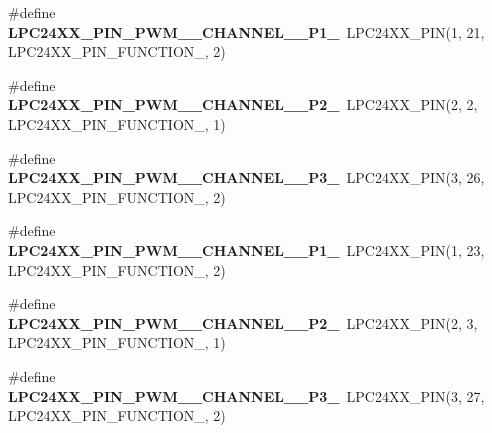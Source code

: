 \begin{DoxyCompactItemize}
\mbox{\label{group__lpc24xx__io_ga3a4b13e38c5b15656f0f3ecd24931f71}} 
\#define {\bfseries L\+P\+C24\+X\+X\+\_\+\+P\+I\+N\+\_\+\+P\+W\+M\+\_\+\_\+\+C\+H\+A\+N\+N\+E\+L\+\_\+\_\+\+P1\+\_}~L\+P\+C24\+X\+X\+\_\+\+P\+IN(1, 21, L\+P\+C24\+X\+X\+\_\+\+P\+I\+N\+\_\+\+F\+U\+N\+C\+T\+I\+O\+N\+\_, 2)
\item 
\mbox{\label{group__lpc24xx__io_gaea149c753bb90d6bdc8951e6630be4a4}} 
\#define {\bfseries L\+P\+C24\+X\+X\+\_\+\+P\+I\+N\+\_\+\+P\+W\+M\+\_\+\_\+\+C\+H\+A\+N\+N\+E\+L\+\_\+\_\+\+P2\+\_}~L\+P\+C24\+X\+X\+\_\+\+P\+IN(2, 2, L\+P\+C24\+X\+X\+\_\+\+P\+I\+N\+\_\+\+F\+U\+N\+C\+T\+I\+O\+N\+\_, 1)
\item 
\mbox{\label{group__lpc24xx__io_ga36bcd51ed83a382d78d56f1c2cdf02e0}} 
\#define {\bfseries L\+P\+C24\+X\+X\+\_\+\+P\+I\+N\+\_\+\+P\+W\+M\+\_\+\_\+\+C\+H\+A\+N\+N\+E\+L\+\_\+\_\+\+P3\+\_}~L\+P\+C24\+X\+X\+\_\+\+P\+IN(3, 26, L\+P\+C24\+X\+X\+\_\+\+P\+I\+N\+\_\+\+F\+U\+N\+C\+T\+I\+O\+N\+\_, 2)
\item 
\mbox{\label{group__lpc24xx__io_ga2d75d3a91f6b14ef36daf17ddf568cfe}} 
\#define {\bfseries L\+P\+C24\+X\+X\+\_\+\+P\+I\+N\+\_\+\+P\+W\+M\+\_\+\_\+\+C\+H\+A\+N\+N\+E\+L\+\_\+\_\+\+P1\+\_}~L\+P\+C24\+X\+X\+\_\+\+P\+IN(1, 23, L\+P\+C24\+X\+X\+\_\+\+P\+I\+N\+\_\+\+F\+U\+N\+C\+T\+I\+O\+N\+\_, 2)
\item 
\mbox{\label{group__lpc24xx__io_ga769970e2975ba283c7fb40e0cbab422a}} 
\#define {\bfseries L\+P\+C24\+X\+X\+\_\+\+P\+I\+N\+\_\+\+P\+W\+M\+\_\+\_\+\+C\+H\+A\+N\+N\+E\+L\+\_\+\_\+\+P2\+\_}~L\+P\+C24\+X\+X\+\_\+\+P\+IN(2, 3, L\+P\+C24\+X\+X\+\_\+\+P\+I\+N\+\_\+\+F\+U\+N\+C\+T\+I\+O\+N\+\_, 1)
\item 
\mbox{\label{group__lpc24xx__io_ga3626ad286bd1f6a9aed3a545e8eda110}} 
\#define {\bfseries L\+P\+C24\+X\+X\+\_\+\+P\+I\+N\+\_\+\+P\+W\+M\+\_\+\_\+\+C\+H\+A\+N\+N\+E\+L\+\_\+\_\+\+P3\+\_}~L\+P\+C24\+X\+X\+\_\+\+P\+IN(3, 27, L\+P\+C24\+X\+X\+\_\+\+P\+I\+N\+\_\+\+F\+U\+N\+C\+T\+I\+O\+N\+\_, 2)
\item 
\mbox{\label{group__lpc24xx__io_ga49e807739d98b0f06ed60727ac036138}} 

\end{DoxyCompactItemize}
